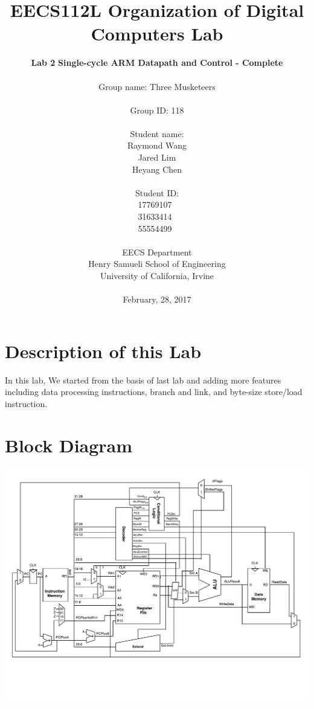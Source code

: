 \documentclass{article}
\begin{document}
\title{EECS112L Organization of Digital Computers Lab}
\author{\textbf{Lab 2} \textbf{Single-cycle ARM Datapath and Control - Complete} \\ \\
Group name: Three Musketeers \\ \\ Group ID: 118 \\ \\ Student name: \\ Raymond Wang \\ Jared Lim\\ Heyang Chen \\ \\ Student ID: \\17769107~\\31633414~\\55554499~\\ \\ 
EECS Department\\ Henry Samueli School of Engineering \\ University of California, Irvine \\ \\
{February, 28, 2017}} 


\date{}
\maketitle

\newpage

\section{Description of this Lab}

In this lab, We started from the basis of last lab and adding more features including data processing instructions, branch and link, and byte-size store/load instruction.

\section{Block Diagram}

\includegraphics[width=1.0\textwidth]{SingleCycleProcessor.pdf}
\end{document}
